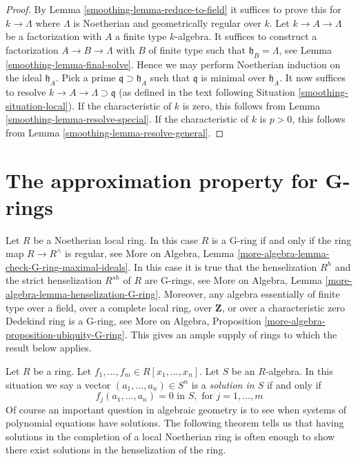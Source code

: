 \begin{proof}

By Lemma \ref{smoothing-lemma-reduce-to-field}
it suffices to prove this for $k \to \Lambda$
where $\Lambda$ is Noetherian and geometrically regular over $k$.
Let $k \to A \to \Lambda$ be a factorization with $A$ a finite type
$k$-algebra. It suffices to construct a factorization
$A \to B \to \Lambda$ with $B$ of finite type such that
$\mathfrak h_B = \Lambda$, see Lemma \ref{smoothing-lemma-final-solve}.
Hence we may perform Noetherian induction on the ideal $\mathfrak h_A$.
Pick a prime $\mathfrak q \supset \mathfrak h_A$ such that
$\mathfrak q$ is minimal over $\mathfrak h_A$.
It now suffices to resolve $k \to A \to \Lambda \supset \mathfrak q$
(as defined in the text following Situation \ref{smoothing-situation-local}).
If the characteristic of $k$ is zero, this follows from
Lemma \ref{smoothing-lemma-resolve-special}.
If the characteristic of $k$ is $p > 0$, this follows from
Lemma \ref{smoothing-lemma-resolve-general}.
\end{proof}

\section{The approximation property for G-rings}
\label{smoothing-section-approximation-G-rings}
Let $R$ be a Noetherian local ring. In this case $R$ is a G-ring if and
only if the ring map $R \to R^\wedge$ is regular, see
More on Algebra, Lemma \ref{more-algebra-lemma-check-G-ring-maximal-ideals}.
In this case it is true that the henselization $R^h$ and the strict
henselization $R^{sh}$ of $R$ are G-rings, see
More on Algebra, Lemma \ref{more-algebra-lemma-henselization-G-ring}.
Moreover, any algebra essentially of finite type over a field, over a
complete local ring, over $\mathbf{Z}$, or over a characteristic zero
Dedekind ring is a G-ring, see
More on Algebra, Proposition \ref{more-algebra-proposition-ubiquity-G-ring}.
This gives an ample supply of rings to which the result below applies.

\medskip\noindent
Let $R$ be a ring. Let $f_1, \ldots, f_m \in R[x_1, \ldots, x_n]$.
Let $S$ be an $R$-algebra. In this situation we say a vector
$(a_1, \ldots, a_n) \in S^n$ is a {\it solution in $S$}
if and only if
$$
f_j(a_1, \ldots, a_n) = 0 \text{ in } S, \text{ for }
j = 1, \ldots, m
$$
Of course an important question in algebraic geometry is to see when
systems of polynomial equations have solutions. The following theorem
tells us that having solutions in the completion of a local Noetherian
ring is often enough to show there exist solutions in the henselization
of the ring.

